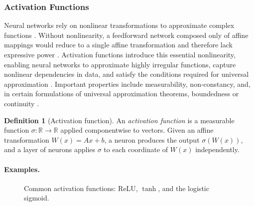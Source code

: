 \documentclass[12pt,a4paper]{article}
\theoremstyle{definition}
\newtheorem{definition}{Definition}[section]
\theoremstyle{plain}
\theoremstyle{remark}
\theoremstyle{plain}
\begin{document}
\subsubsection{Activation Functions}

Neural networks rely on nonlinear transformations to approximate complex functions \cite{HighamHigham2019DeepLearning}. 
Without nonlinearity, a feedforward network composed only of affine mappings would reduce to a single affine transformation and therefore lack expressive power \cite{Hornik1991}. 
Activation functions introduce this essential nonlinearity, enabling neural networks to approximate highly irregular functions, capture nonlinear dependencies in data, and satisfy the conditions required for universal approximation \cite{Hornik1991,HighamHigham2019DeepLearning}. 
Important properties include measurability, non‐constancy, and, in certain formulations of universal approximation theorems, boundedness or continuity \cite{Hornik1991, HighamHigham2019DeepLearning}.


\begin{definition}[Activation function]
\label{def:activation_function}
An \emph{activation function} is a measurable function $\sigma:\mathbb{R}\to\mathbb{R}$ applied componentwise to vectors. 
Given an affine transformation $W(x)=Ax+b$, a neuron produces the output $\sigma(W(x))$, and a layer of neurons applies $\sigma$ to each coordinate of $W(x)$ independently.
\end{definition}

\paragraph{Examples.}

\begin{figure}[h!]
\centering

\hspace{1.5cm}

\vspace{8mm}


\caption{Common activation functions: ReLU, $\tanh$, and the logistic sigmoid.}
\label{fig:activations}
\end{figure}
\end{document}
